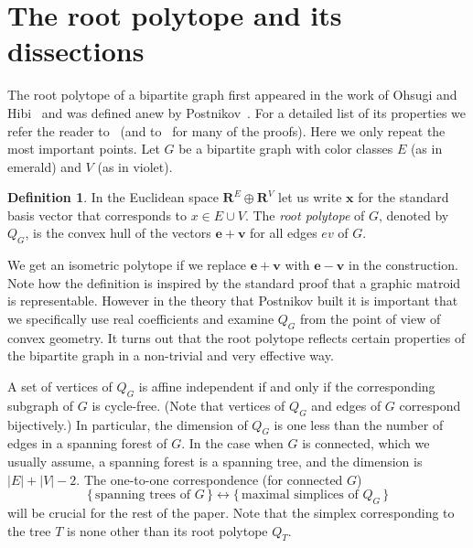 \documentclass[10pt]{amsart}
\theoremstyle{definition}\newtheorem{defi}[theo]{Definition}
\theoremstyle{remark}\newtheorem{rema}[theo]{Remark}
\newcommand{\R}{\mathbf{R}}
\begin{document}
\section{The root polytope and its dissections} 
\label{sec:root_polytope}

The root polytope of a bipartite graph first appeared in the work of Ohsugi and Hibi~\cite{hibi} and was defined anew by Postnikov~\cite{alex}. For a detailed list of its properties we refer the reader to~\cite[Section~3]{KP_Ehrhart} (and to~\cite{alex} for many of the proofs). Here we only repeat the most important points. Let $G$ be a bipartite graph with color classes $E$ (as in emerald) and $V$ (as in violet). 

\begin{defi} %
\label{def:rootpolytope}
In the Euclidean space $\R^E\oplus\R^V$ let us write $\mathbf x$ for the standard basis vector that corresponds to $x\in E \cup V$. The \emph{root polytope} of $G$, denoted by $Q_G$, is the convex hull of the vectors $\mathbf e +\mathbf v$ for all edges $ev$ of $G$.
\end{defi}

We get an isometric polytope if we replace $\mathbf e +\mathbf v$ with $\mathbf e -\mathbf v$ in the construction. Note how the definition is inspired by the standard proof that a graphic matroid is representable. However in the theory that Postnikov built it is important that we specifically use real coefficients and examine $Q_G$ from the point of view of convex geometry. It turns out that the root polytope reflects certain properties of the bipartite graph in a non-trivial and very effective way.
 
A set of vertices of $Q_G$ is affine independent if and only if the corresponding subgraph of $G$ is cycle-free. (Note that vertices of $Q_G$ and edges of $G$ correspond bijectively.) In particular, the dimension of $Q_G$ is one less than the number of edges in a spanning forest of $G$. In the case when $G$ is connected, which we usually assume, a spanning forest is a spanning tree, and the dimension is $|E|+|V|-2$. The one-to-one correspondence (for connected $G$)
\[\{\,\text{spanning trees of }G\,\}\longleftrightarrow\{\,\text{maximal simplices of }Q_G\,\}\]
will be crucial for the rest of the paper. Note that the simplex corresponding to the tree $T$ is none other than its root polytope $Q_T$.
\end{document}
